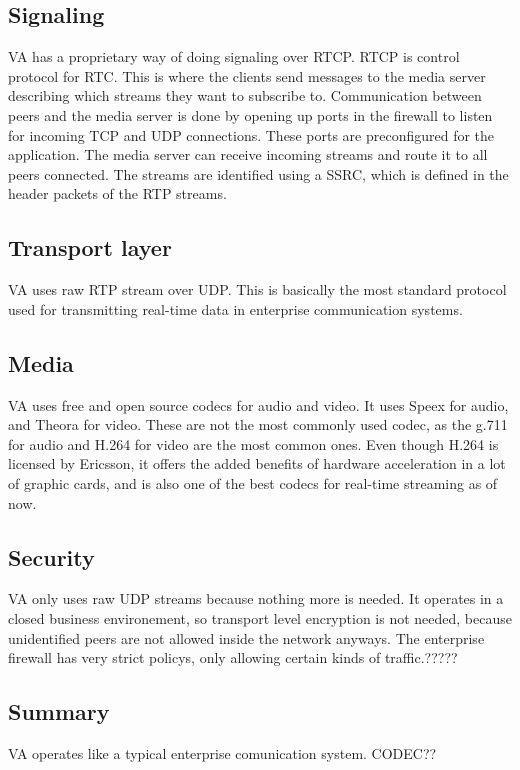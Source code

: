 \subsection{Signaling}
VA has a proprietary way of doing signaling over RTCP. RTCP is control protocol for RTC. This is where the clients send messages to the media server describing which streams they want to subscribe to. Communication between peers and the media server is done by opening up ports in the firewall to listen for incoming TCP and UDP connections. These ports are preconfigured for the application. The media server can receive incoming streams and route it to all peers connected. The streams are identified using a SSRC, which is defined in the header packets of the RTP streams.

\subsection{Transport layer}
VA uses raw RTP stream over UDP. This is basically the most standard protocol used for transmitting real-time data in enterprise communication systems\cite{}.

\subsection{Media}
VA uses free and open source codecs for audio and video. It uses Speex for audio, and Theora for video. These are not the most commonly used codec, as the g.711 for audio and H.264 for video are the most common ones. Even though H.264 is licensed by Ericsson, it offers the added benefits of hardware acceleration in a lot of graphic cards, and is also one of the best codecs for real-time streaming as of now\cite{source}.


\subsection{Security}
VA only uses raw UDP streams because nothing more is needed. It operates in a closed business environement, so transport level encryption is not needed, because unidentified peers are not allowed inside the network anyways. The enterprise firewall has very strict policys, only allowing certain kinds of traffic.?????

\subsection*{Summary}
VA operates like a typical enterprise comunication system. CODEC?? 